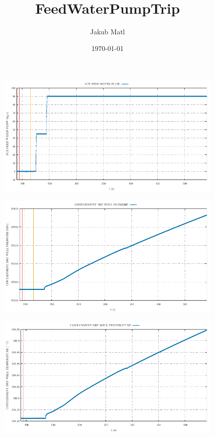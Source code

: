 \documentclass{article}
\title{FeedWaterPumpTrip}
\author{Jakub Matl}
\date{\today}
\begin{document}
\maketitle
\begin{multicols}{2}
\begin{figure}[H]
\centering
\includegraphics[width=\linewidth]{./graphs/AUX FEED WATER FLOW_comp.pdf}
\end{figure}
\begin{figure}[H]
\centering
\includegraphics[width=\linewidth]{./graphs/CONTAINMENT DRY WELL PRESSURE_comp.pdf}
\end{figure}
\begin{figure}[H]
\centering
\includegraphics[width=\linewidth]{./graphs/CONTAINMENT DRY WELL TEMPERATURE_comp.pdf}

\end{figure}
\end{multicols}
\end{document}
